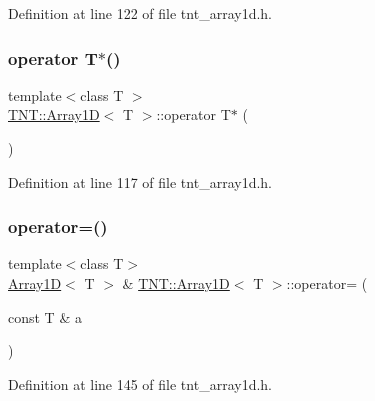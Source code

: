 Definition at line 122 of file tnt\+\_\+array1d.\+h.

\mbox{\label{classTNT_1_1Array1D_a0e2f6065b8e549e4138937417117f067}} 
\subsubsection{\texorpdfstring{operator T$\ast$()}{operator T*()}}
{\footnotesize\ttfamily template$<$class T $>$ \\
\hyperlink{classTNT_1_1Array1D}{T\+N\+T\+::\+Array1D}$<$ T $>$\+::operator T$\ast$ (\begin{DoxyParamCaption}{ }\end{DoxyParamCaption})\hspace{0.3cm}{\ttfamily [inline]}}



Definition at line 117 of file tnt\+\_\+array1d.\+h.

\mbox{\label{classTNT_1_1Array1D_aaf1264253a6e721f065287a7a2405764}} 
\subsubsection{\texorpdfstring{operator=()}{operator=()}\hspace{0.1cm}{\footnotesize\ttfamily [1/2]}}
{\footnotesize\ttfamily template$<$class T$>$ \\
\hyperlink{classTNT_1_1Array1D}{Array1D}$<$ T $>$ \& \hyperlink{classTNT_1_1Array1D}{T\+N\+T\+::\+Array1D}$<$ T $>$\+::operator= (\begin{DoxyParamCaption}\item[{const T \&}]{a }\end{DoxyParamCaption})\hspace{0.3cm}{\ttfamily [inline]}}



Definition at line 145 of file tnt\+\_\+array1d.\+h.

\mbox{\label{classTNT_1_1Array1D_afa653e3563d08d4abc0a6f186e561b0e}} 
